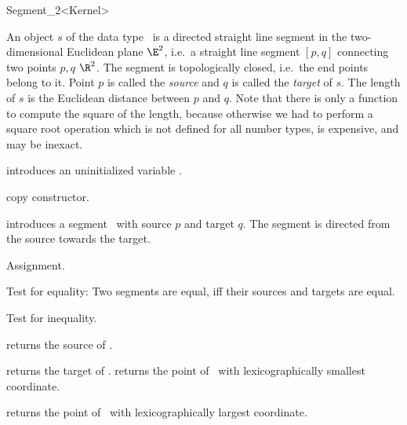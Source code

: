 \begin{ccRefClass} {Segment_2<Kernel>}


\ccDefinition  An object $s$ of the data type \ccRefName\ is a directed
straight line segment in the two-dimensional Euclidean plane $\E^2$, i.e.\ a
straight line segment $[p,q]$ connecting two points $p,q$ 
$\R^2$. The segment is topologically closed, i.e.\  the end
points belong to it. Point $p$ is called the {\em source} and $q$
is called the {\em target} of $s$. The length of $s$ is the
Euclidean distance between $p$ and $q$. Note that there is only a function
to compute the square of the length, because otherwise we had to
perform a square root operation which is not defined for all
number types, is expensive, and may be inexact.

\ccCreation
{}


\ccHidden {}
             {introduces an uninitialized variable \ccVar.}

\ccHidden {}
 	    {copy constructor.}

            {introduces a segment \ccVar\ with source $p$
             and target $q$. The segment is directed from the source towards
             the target.}


\ccOperations

\ccHidden {}
        {Assignment.}

       {Test for equality: Two segments are equal, iff their sources and
        targets are equal.}

       {Test for inequality.}


       {returns the source of \ccVar.}

       {returns the target of \ccVar.}
\ccGlue
{}
       {returns the point of \ccVar\ with lexicographically smallest coordinate.}

       {returns the point of \ccVar\ with lexicographically largest coordinate.}



\end{ccRefClass}
